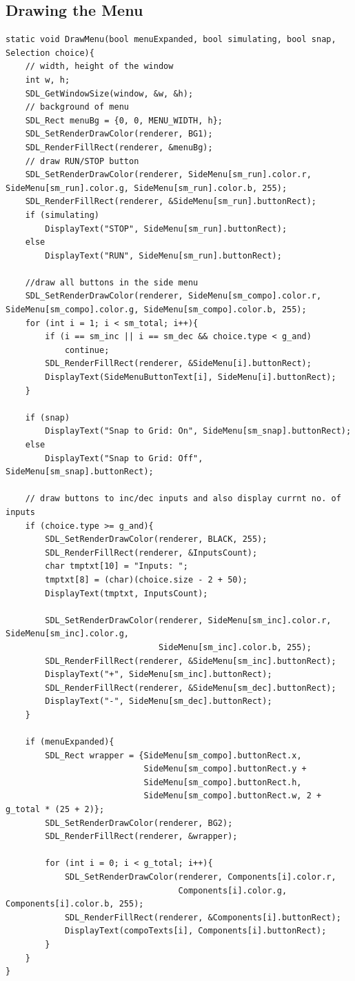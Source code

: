 \documentclass[report]{subfiles}
\begin{document}
	\subsection{Drawing the Menu}
\begin{lstlisting}
static void DrawMenu(bool menuExpanded, bool simulating, bool snap, Selection choice){
    // width, height of the window
    int w, h;
    SDL_GetWindowSize(window, &w, &h); 
    // background of menu
    SDL_Rect menuBg = {0, 0, MENU_WIDTH, h};
    SDL_SetRenderDrawColor(renderer, BG1); 
    SDL_RenderFillRect(renderer, &menuBg);
    // draw RUN/STOP button
    SDL_SetRenderDrawColor(renderer, SideMenu[sm_run].color.r, SideMenu[sm_run].color.g, SideMenu[sm_run].color.b, 255);
    SDL_RenderFillRect(renderer, &SideMenu[sm_run].buttonRect);
    if (simulating)
        DisplayText("STOP", SideMenu[sm_run].buttonRect);
    else
        DisplayText("RUN", SideMenu[sm_run].buttonRect);

    //draw all buttons in the side menu
    SDL_SetRenderDrawColor(renderer, SideMenu[sm_compo].color.r,  SideMenu[sm_compo].color.g, SideMenu[sm_compo].color.b, 255);
    for (int i = 1; i < sm_total; i++){
        if (i == sm_inc || i == sm_dec && choice.type < g_and)
            continue;
        SDL_RenderFillRect(renderer, &SideMenu[i].buttonRect);
        DisplayText(SideMenuButtonText[i], SideMenu[i].buttonRect);
    }

    if (snap)
        DisplayText("Snap to Grid: On", SideMenu[sm_snap].buttonRect);
    else
        DisplayText("Snap to Grid: Off", SideMenu[sm_snap].buttonRect);

    // draw buttons to inc/dec inputs and also display currnt no. of inputs
    if (choice.type >= g_and){
        SDL_SetRenderDrawColor(renderer, BLACK, 255);
        SDL_RenderFillRect(renderer, &InputsCount);
        char tmptxt[10] = "Inputs: ";
        tmptxt[8] = (char)(choice.size - 2 + 50);
        DisplayText(tmptxt, InputsCount);

        SDL_SetRenderDrawColor(renderer, SideMenu[sm_inc].color.r, SideMenu[sm_inc].color.g,
                               SideMenu[sm_inc].color.b, 255);
        SDL_RenderFillRect(renderer, &SideMenu[sm_inc].buttonRect);
        DisplayText("+", SideMenu[sm_inc].buttonRect);
        SDL_RenderFillRect(renderer, &SideMenu[sm_dec].buttonRect);
        DisplayText("-", SideMenu[sm_dec].buttonRect);
    }

    if (menuExpanded){
        SDL_Rect wrapper = {SideMenu[sm_compo].buttonRect.x,
                            SideMenu[sm_compo].buttonRect.y +
                            SideMenu[sm_compo].buttonRect.h,
                            SideMenu[sm_compo].buttonRect.w, 2 + g_total * (25 + 2)};
        SDL_SetRenderDrawColor(renderer, BG2);
        SDL_RenderFillRect(renderer, &wrapper);

        for (int i = 0; i < g_total; i++){
            SDL_SetRenderDrawColor(renderer, Components[i].color.r,
                                   Components[i].color.g, Components[i].color.b, 255);
            SDL_RenderFillRect(renderer, &Components[i].buttonRect);
            DisplayText(compoTexts[i], Components[i].buttonRect);
        }
    }
}
\end{lstlisting}
\end{document}
